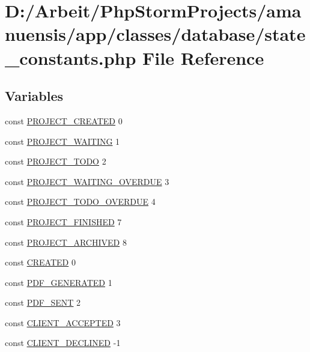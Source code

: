 \hypertarget{a00090}{}\section{D\+:/\+Arbeit/\+Php\+Storm\+Projects/amanuensis/app/classes/database/state\+\_\+constants.php File Reference}
\label{a00090}
\subsection*{Variables}
\begin{DoxyCompactItemize}
\item 
const \hyperlink{a00090_a4a341097343a682ca8ea9c23e1cdb560}{P\+R\+O\+J\+E\+C\+T\+\_\+\+C\+R\+E\+A\+T\+E\+D} 0
\item 
const \hyperlink{a00090_a9b1c98c1e105e5cc53a9bfeca3d4dfd6}{P\+R\+O\+J\+E\+C\+T\+\_\+\+W\+A\+I\+T\+I\+N\+G} 1
\item 
const \hyperlink{a00090_a7b1b9a63475a0cf7e04d849e00a03ea9}{P\+R\+O\+J\+E\+C\+T\+\_\+\+T\+O\+D\+O} 2
\item 
const \hyperlink{a00090_af0cc4f0bc7d559c15308bba8ce77de57}{P\+R\+O\+J\+E\+C\+T\+\_\+\+W\+A\+I\+T\+I\+N\+G\+\_\+\+O\+V\+E\+R\+D\+U\+E} 3
\item 
const \hyperlink{a00090_a98b43ac17decfae1c69e94dbfbf2357a}{P\+R\+O\+J\+E\+C\+T\+\_\+\+T\+O\+D\+O\+\_\+\+O\+V\+E\+R\+D\+U\+E} 4
\item 
const \hyperlink{a00090_abd7589634b87f8da699638ed99f163fd}{P\+R\+O\+J\+E\+C\+T\+\_\+\+F\+I\+N\+I\+S\+H\+E\+D} 7
\item 
const \hyperlink{a00090_af95db4629e61f0761ec2d794434d109d}{P\+R\+O\+J\+E\+C\+T\+\_\+\+A\+R\+C\+H\+I\+V\+E\+D} 8
\item 
const \hyperlink{a00090_ab09394540835ab7c604a4f2c4824a7c6}{C\+R\+E\+A\+T\+E\+D} 0
\item 
const \hyperlink{a00090_a04ebd20953c2e35ed2d3190ee9f51aa3}{P\+D\+F\+\_\+\+G\+E\+N\+E\+R\+A\+T\+E\+D} 1
\item 
const \hyperlink{a00090_a3566f66cefbc079bfe12c580ab435d15}{P\+D\+F\+\_\+\+S\+E\+N\+T} 2
\item 
const \hyperlink{a00090_ac8a499359086bec8e2d47f91cba4eb31}{C\+L\+I\+E\+N\+T\+\_\+\+A\+C\+C\+E\+P\+T\+E\+D} 3
\item 
const \hyperlink{a00090_aa398870ec700028fa7a1674373a0f52c}{C\+L\+I\+E\+N\+T\+\_\+\+D\+E\+C\+L\+I\+N\+E\+D} -\/1

\end{DoxyCompactItemize}
